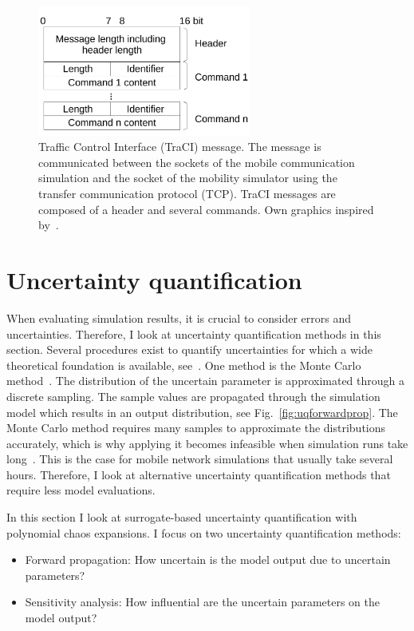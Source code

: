 \begin{figure}[hbt!]
\centering
\includegraphics[width=7cm]{../figures/state-of-the-art/coupling/traci.pdf} 
\caption{Traffic Control Interface (TraCI) message. The message is communicated between the sockets of the mobile communication simulation and the socket of the mobility simulator  using the transfer communication protocol (TCP). TraCI messages are composed of a header and several commands. Own graphics inspired by~\cite{wegener-2008-com}.}
\label{fig:tracimessage}
\end{figure}






\section{Uncertainty quantification}
\label{sec:uq}
When evaluating simulation results, it is crucial to consider errors and uncertainties. Therefore, I look at uncertainty quantification methods in this section.
Several procedures exist to quantify uncertainties for which a wide theoretical foundation is available, see~\cite{smith-2014-math,xiu-2010-math}. 
One method is the Monte Carlo method~\cite{smith-2014-math}. The distribution of the uncertain parameter is approximated through a discrete sampling. The sample values are propagated through the simulation model which results in an output distribution, see Fig.~\ref{fig:uqforwardprop}. 
The Monte Carlo method requires many samples to approximate the distributions accurately, which is why applying it becomes infeasible when simulation runs take long~\cite{smith-2014-math}. This is the case for mobile network simulations that usually take several hours.
Therefore, I look at alternative uncertainty quantification methods that require less model evaluations.

In this section I look at surrogate-based uncertainty quantification with polynomial chaos expansions. I focus on two uncertainty quantification methods:
 \begin{itemize}
 \item Forward propagation: How uncertain is the model output due to uncertain parameters? 
 \item Sensitivity analysis: How influential are the uncertain parameters on the model output?
 \end{itemize}
 
